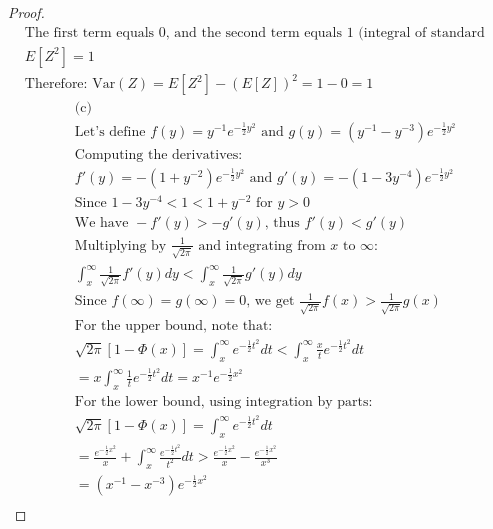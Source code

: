 \documentclass[letterpaper, 11pt]{article}
\newcommand{\1}{\mathds{1}}	%
\theoremstyle{definition}
\begin{document}
\begin{proof}
\begin{align*}
                &\text{The first term equals 0, and the second term equals 1 (integral of standard normal PDF)}\\
                &E[Z^2] = 1\\
                &\text{Therefore: }\text{Var}(Z) = E[Z^2] - (E[Z])^2 = 1 - 0 = 1
                \end{align*}
                \begin{align*}
                &\text{(c) }\\
                                    &\text{Let's define } f(y) = y^{-1}e^{-\frac{1}{2}y^2} \text{ and } g(y) = (y^{-1} - y^{-3})e^{-\frac{1}{2}y^2}\\
                    &\text{Computing the derivatives:}\\
                    &f'(y) = -(1 + y^{-2})e^{-\frac{1}{2}y^2} \text{ and } g'(y) = -(1 - 3y^{-4})e^{-\frac{1}{2}y^2}\\
                    &\text{Since } 1 - 3y^{-4} < 1 < 1 + y^{-2} \text{ for } y > 0\\
                    &\text{We have } -f'(y) > -g'(y) \text{, thus } f'(y) < g'(y)\\
                    &\text{Multiplying by } \frac{1}{\sqrt{2\pi}} \text{ and integrating from $x$ to $\infty$:}\\
                    &\int_{x}^{\infty} \frac{1}{\sqrt{2\pi}}f'(y) dy < \int_{x}^{\infty} \frac{1}{\sqrt{2\pi}}g'(y) dy\\
                    &\text{Since } f(\infty) = g(\infty) = 0 \text{, we get } \frac{1}{\sqrt{2\pi}}f(x) > \frac{1}{\sqrt{2\pi}}g(x)\\
                    &\text{For the upper bound, note that:}\\
                    &\sqrt{2\pi}[1-\Phi(x)] = \int_{x}^{\infty}e^{-\frac{1}{2}t^2}dt < \int_{x}^{\infty}\frac{x}{t}e^{-\frac{1}{2}t^2}dt\\
                    &= x\int_{x}^{\infty}\frac{1}{t}e^{-\frac{1}{2}t^2}dt = x^{-1}e^{-\frac{1}{2}x^2}\\
                    &\text{For the lower bound, using integration by parts:}\\
                    &\sqrt{2\pi}[1-\Phi(x)] = \int_{x}^{\infty}e^{-\frac{1}{2}t^2}dt\\
                    &= \frac{e^{-\frac{1}{2}x^2}}{x} + \int_{x}^{\infty}\frac{e^{-\frac{1}{2}t^2}}{t^2}dt > \frac{e^{-\frac{1}{2}x^2}}{x} - \frac{e^{-\frac{1}{2}x^2}}{x^3}\\
                    &= (x^{-1} - x^{-3})e^{-\frac{1}{2}x^2}\\

\end{align*}
\end{proof}
\end{document}

